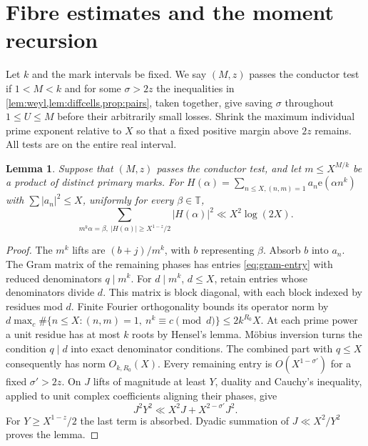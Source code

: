 \documentclass[11pt,letterpaper]{article}
\newtheorem{lemma}[lemma]{Lemma}
\theoremstyle{definition}
\newcommand{\T}{\mathbb T}
\newcommand{\e}{\mathrm e}
\begin{document}
\section{Fibre estimates and the moment recursion}\label{sec:recursion}
Let $k$ and the mark intervals be fixed. We say $(M,z)$ passes the
conductor test if $1<M<k$ and for some $\sigma>2z$ the inequalities in
\cref{lem:weyl,lem:diffcells,prop:pairs}, taken together, give saving
$\sigma$ throughout $1\le U\le M$ before their arbitrarily small
losses. Shrink the maximum individual prime exponent relative to $X$ so
that a fixed positive margin above $2z$ remains. All tests are on the
entire real interval.

\begin{lemma}\label{lem:fibre}
Suppose that $(M,z)$ passes the conductor test, and let $m\le X^{M/k}$ be a product of distinct primary marks.
For $H(\alpha)=\sum_{n\le X,(n,m)=1}a_n\e(\alpha n^k)$ with
$\sum|a_n|^2\le X$, uniformly for every $\beta\in\T$,
\[
 \sum_{m^k\alpha=\beta,\ |H(\alpha)|\ge X^{1-z}/2}|H(\alpha)|^2
 \ll X^2\log(2X).
\]
\end{lemma}
\begin{proof}
The $m^k$ lifts are $(b+j)/m^k$, with $b$ representing $\beta$.
Absorb $b$ into $a_n$. The Gram matrix of the remaining phases has entries
\eqref{eq:gram-entry} with reduced denominators $q\mid m^k$.
For $d\mid m^k$, $d\le X$, retain entries whose denominators divide $d$.
This matrix is block diagonal, with each block indexed by residues mod
$d$. Finite Fourier orthogonality bounds its operator norm by
$d\max_c\#\{n\le X:(n,m)=1,\ n^k\equiv c\pmod d\}\le2k^{R_0}X$.
At each prime power a unit residue has at most $k$ roots by Hensel's
lemma. M\"obius inversion turns the condition $q\mid d$ into exact
denominator conditions. The combined part with $q\le X$ consequently
has norm $O_{k,R_0}(X)$. Every remaining entry is $O(X^{1-\sigma'})$
for a fixed $\sigma'>2z$. On $J$ lifts of magnitude at least $Y$,
duality and Cauchy's inequality, applied to unit complex coefficients
aligning their phases, give
\[
 J^2Y^2\ll X^2J+X^{2-\sigma'}J^2.
\]
For $Y\ge X^{1-z}/2$ the last term is absorbed. Dyadic summation of
$J\ll X^2/Y^2$ proves the lemma.
\end{proof}
\end{document}
